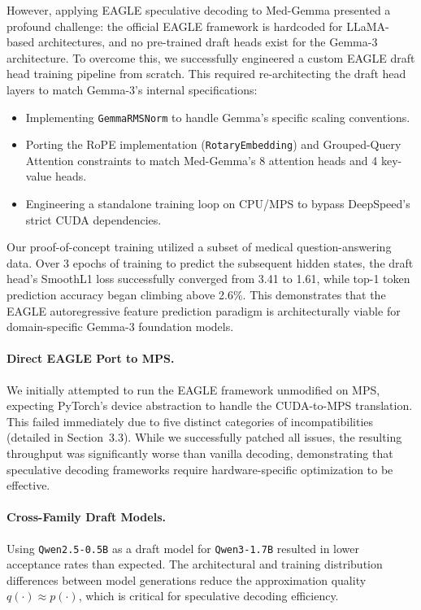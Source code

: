 \documentclass[11pt]{article}
\begin{document}
However, applying EAGLE speculative decoding to Med-Gemma presented a profound challenge: the official EAGLE framework is hardcoded for LLaMA-based architectures, and no pre-trained draft heads exist for the Gemma-3 architecture. To overcome this, we successfully engineered a custom EAGLE draft head training pipeline from scratch. This required re-architecting the draft head layers to match Gemma-3's internal specifications:
\begin{itemize}
    \item Implementing \texttt{GemmaRMSNorm} to handle Gemma's specific scaling conventions.
    \item Porting the RoPE implementation (\texttt{RotaryEmbedding}) and Grouped-Query Attention constraints to match Med-Gemma's 8 attention heads and 4 key-value heads.
    \item Engineering a standalone training loop on CPU/MPS to bypass DeepSpeed's strict CUDA dependencies.
\end{itemize}
Our proof-of-concept training utilized a subset of medical question-answering data. Over 3 epochs of training to predict the subsequent hidden states, the draft head's SmoothL1 loss successfully converged from 3.41 to 1.61, while top-1 token prediction accuracy began climbing above 2.6\%. This demonstrates that the EAGLE autoregressive feature prediction paradigm is architecturally viable for domain-specific Gemma-3 foundation models.

\paragraph{Direct EAGLE Port to MPS.}
We initially attempted to run the EAGLE framework unmodified on MPS, expecting PyTorch's device abstraction to handle the CUDA-to-MPS translation. This failed immediately due to five distinct categories of incompatibilities (detailed in Section~3.3). While we successfully patched all issues, the resulting throughput was significantly worse than vanilla decoding, demonstrating that speculative decoding frameworks require hardware-specific optimization to be effective.

\paragraph{Cross-Family Draft Models.}
Using \texttt{Qwen2.5-0.5B} as a draft model for \texttt{Qwen3-1.7B} resulted in lower acceptance rates than expected. The architectural and training distribution differences between model generations reduce the approximation quality $q(\cdot) \approx p(\cdot)$, which is critical for speculative decoding efficiency.
\end{document}
